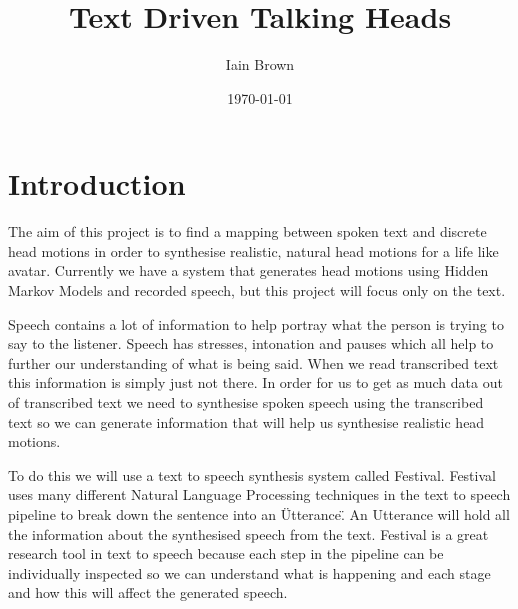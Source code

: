 \documentclass[bsc,frontabs,twoside,singlespacing,parskip]{infthesis}     %
\begin{document}
\title{Text Driven Talking Heads}

\author{Iain Brown}

\date{\today}
\maketitle
\tableofcontents
\chapter{Introduction}
The aim of this project is to find a mapping between spoken text and discrete head motions in order to synthesise realistic, natural head motions for a life like avatar. Currently we have a system that generates head motions using Hidden Markov Models and recorded speech, but this project will focus only on the text.

Speech contains a lot of information to help portray what the person is trying to say to the listener. Speech has stresses, intonation and pauses which all help to further our understanding of what is being said. When we read transcribed text this information is simply just not there. In order for us to get as much data out of transcribed text we need to synthesise spoken speech using the transcribed text so we can generate information that will help us synthesise realistic head motions.

To do this we will use a text to speech synthesis system called Festival. Festival uses many different Natural Language Processing techniques in the text to speech pipeline to break down the sentence into an \"Utterance\". An Utterance will hold all the information about the synthesised speech from the text. Festival is a great research tool in text to speech because each step in the pipeline can be individually inspected so we can understand what is happening and each stage and how this will affect the generated speech.
\end{document}
